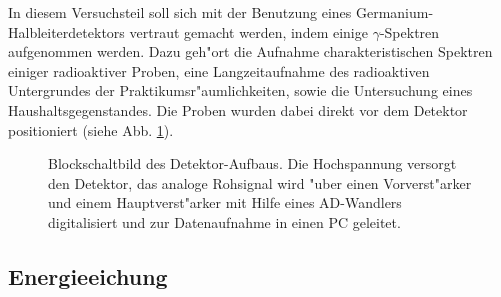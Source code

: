 \documentclass[12pt]{article}
\begin{document}
In diesem Versuchsteil soll sich mit der Benutzung eines Germanium-Halbleiterdetek\-tors vertraut gemacht werden, indem einige $\gamma$-Spektren aufgenommen werden. Dazu geh"ort die Aufnahme charakteristischen Spektren einiger radioaktiver Proben, eine Langzeitaufnahme des radioaktiven Untergrundes der Praktikumsr"aumlichkeiten, sowie die Untersuchung eines Haushaltsgegenstandes. Die Proben wurden dabei direkt vor dem Detektor positioniert (siehe Abb. \ref{fig:schaltbild}).
\begin{figure}[h]
	\centering
	\caption[Blockschaltbild]{Blockschaltbild des Detektor-Aufbaus. Die Hochspannung versorgt den Detektor, das analoge Rohsignal wird "uber einen Vorverst"arker und einem Hauptverst"arker mit Hilfe eines AD-Wandlers digitalisiert und zur Datenaufnahme in einen PC geleitet.} \label{fig:schaltbild}
\end{figure}
    

\subsection{Energieeichung}
\end{document}
